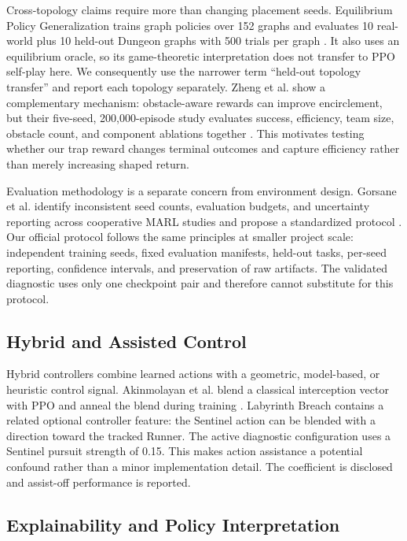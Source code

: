 \documentclass[journal]{IEEEtran}
\begin{document}
Cross-topology claims require more than changing placement seeds. Equilibrium Policy Generalization trains graph policies over 152 graphs and evaluates 10 real-world plus 10 held-out Dungeon graphs with 500 trials per graph \cite{lu2025epg}. It also uses an equilibrium oracle, so its game-theoretic interpretation does not transfer to PPO self-play here. We consequently use the narrower term ``held-out topology transfer'' and report each topology separately. Zheng et al. show a complementary mechanism: obstacle-aware rewards can improve encirclement, but their five-seed, 200,000-episode study evaluates success, efficiency, team size, obstacle count, and component ablations together \cite{zheng2023encirclement}. This motivates testing whether our trap reward changes terminal outcomes and capture efficiency rather than merely increasing shaped return.

Evaluation methodology is a separate concern from environment design. Gorsane et al. identify inconsistent seed counts, evaluation budgets, and uncertainty reporting across cooperative MARL studies and propose a standardized protocol \cite{gorsane2022}. Our official protocol follows the same principles at smaller project scale: independent training seeds, fixed evaluation manifests, held-out tasks, per-seed reporting, confidence intervals, and preservation of raw artifacts. The validated diagnostic uses only one checkpoint pair and therefore cannot substitute for this protocol.

\subsection{Hybrid and Assisted Control}

Hybrid controllers combine learned actions with a geometric, model-based, or heuristic control signal. Akinmolayan et al. blend a classical interception vector with PPO and anneal the blend during training \cite{akinmolayan2026}. Labyrinth Breach contains a related optional controller feature: the Sentinel action can be blended with a direction toward the tracked Runner. The active diagnostic configuration uses a Sentinel pursuit strength of 0.15. This makes action assistance a potential confound rather than a minor implementation detail. The coefficient is disclosed and assist-off performance is reported.

\subsection{Explainability and Policy Interpretation}
\end{document}
